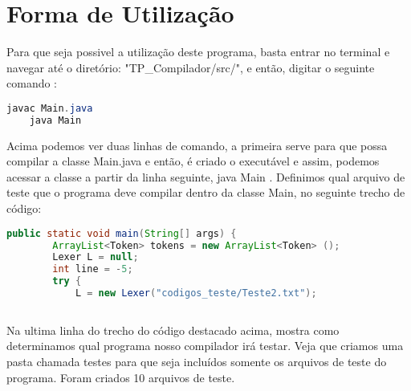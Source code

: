 \chapter{Forma de Utilização}
\usepackage{}
Para que seja possivel a utilização deste programa, basta entrar no terminal e navegar até o diretório: "TP{\_}Compilador/src/", e então, digitar o seguinte comando :
\begin{lstlisting}[language=Java, caption={Entrada terminal},label={Terminal para inicio do Programa}]
    javac Main.java
    java Main
\end{lstlisting}
Acima podemos ver duas linhas de comando, a primeira serve para que possa compilar a classe Main.java e então, é criado o executável e assim, podemos acessar a classe a partir da linha seguinte, java Main .
\newline
Definimos qual arquivo de teste que o programa deve compilar dentro da classe Main, no seguinte trecho de código:
\begin{lstlisting}[language=Java, caption={Indicando arquivo para teste},label={Terminal para inicio do Programa}]
    public static void main(String[] args) {
		ArrayList<Token> tokens = new ArrayList<Token> ();
		Lexer L = null;
		int line = -5;
		try {
			L = new Lexer("codigos_teste/Teste2.txt");
			
\end{lstlisting}
\newline 
Na ultima linha do trecho do código destacado acima, mostra como determinamos qual programa nosso compilador irá testar.
Veja que criamos uma pasta chamada testes para que seja incluídos somente os arquivos de teste do programa. Foram criados 10 arquivos de teste.




